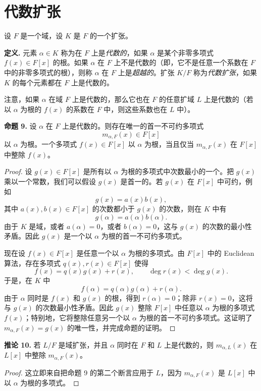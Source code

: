 \section{代数扩张}

设 $F$ 是一个域，设 $K$ 是 $F$ 的一个扩张。

\noindent\textbf{定义.} 元素 $\alpha\in K$ 称为在 $F$ 上是\emph{代数的}，如果 $\alpha$ 是某个非零多项式 $f(x)\in F[x]$ 的根。如果 $\alpha$ 在 $F$ 上不是代数的（即，它不是任意一个系数在 $F$ 中的非零多项式的根），则称 $\alpha$ 在 $F$ 上是\emph{超越的}。扩张 $K/F$ 称为\emph{代数扩张}，如果 $K$ 的每个元素都在 $F$ 上是代数的。

注意，如果 $\alpha$ 在域 $F$ 上是代数的，那么它也在 $F$ 的任意扩域 $L$ 上是代数的（若以 $\alpha$ 为根的 $f(x)$ 的系数在 $F$ 中，则这些系数也在 $L$ 中）。

\noindent\textbf{命题 9.} 设 $\alpha$ 在 $F$ 上是代数的。则存在唯一的首一不可约多项式
\[
m_{\alpha,F}(x)\in F[x]
\]
以 $\alpha$ 为根。一个多项式 $f(x)\in F[x]$ 以 $\alpha$ 为根，当且仅当 $m_{\alpha,F}(x)$ 在 $F[x]$ 中整除 $f(x)$。

\begin{proof}
	设 $g(x)\in F[x]$ 是所有以 $\alpha$ 为根的多项式中次数最小的一个。把 $g(x)$ 乘以一个常数，我们可以假设 $g(x)$ 是首一的。若 $g(x)$ 在 $F[x]$ 中可约，例如
	\[
	g(x)=a(x)b(x),
	\]
	其中 $a(x),b(x)\in F[x]$ 的次数都小于 $g(x)$ 的次数，则在 $K$ 中有
	\[
	g(\alpha)=a(\alpha)b(\alpha).
	\]
	由于 $K$ 是域，或者 $a(\alpha)=0$，或者 $b(\alpha)=0$，这与 $g(x)$ 的次数的最小性矛盾。因此 $g(x)$ 是一个以 $\alpha$ 为根的首一不可约多项式。
	
	现在设 $f(x)\in F[x]$ 是任意一个以 $\alpha$ 为根的多项式。由 $F[x]$ 中的 Euclidean 算法，存在多项式 $q(x),r(x)\in F[x]$ 使得
	\[
	f(x)=q(x)g(x)+r(x),\qquad \deg r(x)<\deg g(x).
	\]
	于是，在 $K$ 中
	\[
	f(\alpha)=q(\alpha)g(\alpha)+r(\alpha).
	\]
	由于 $\alpha$ 同时是 $f(x)$ 和 $g(x)$ 的根，得到 $r(\alpha)=0$；除非 $r(x)=0$，这将与 $g(x)$ 的次数最小性矛盾。因此 $g(x)$ 整除 $F[x]$ 中任意以 $\alpha$ 为根的多项式 $f(x)$；特别地，它将整除任意另一个以 $\alpha$ 为根的首一不可约多项式。这证明了 $m_{\alpha,F}(x)=g(x)$ 的唯一性，并完成命题的证明。
\end{proof}

\noindent\textbf{推论 10.} 若 $L/F$ 是域扩张，并且 $\alpha$ 同时在 $F$ 和 $L$ 上是代数的，则 $m_{\alpha,L}(x)$ 在 $L[x]$ 中整除 $m_{\alpha,F}(x)$。

\begin{proof}
	这立即来自把命题 9 的第二个断言应用于 $L$，因为 $m_{\alpha,F}(x)$ 是 $L[x]$ 中以 $\alpha$ 为根的多项式。
\end{proof}

